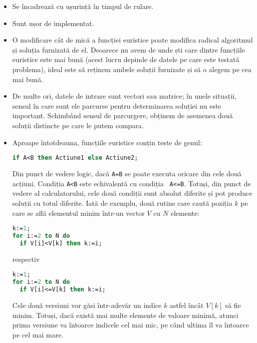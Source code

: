 \begin{itemize}

\item Se încadrează cu ușurință în timpul de rulare.

\item Sunt ușor de implementat.

\item O modificare cât de mică a funcției euristice poate modifica radical
  algoritmul și soluția furnizată de el. Deoarece nu avem de unde ști care
  dintre funcțiile euristice este mai bună (acest lucru depinde de datele pe
  care este testată problema), ideal este să reținem ambele soluții furnizate
  și să o alegem pe cea mai bună.

\item De multe ori, datele de intrare sunt vectori sau matrice; în unele
  situații, sensul în care sunt ele parcurse pentru determinarea soluției nu
  este important. Schimbând sensul de parcurgere, obținem de asemenea două
  soluții distincte pe care le putem compara.

\item Aproape întotdeauna, funcțiile euristice conțin teste de genul:

\begin{lstlisting}[language=Pascal]
if A<B then Actiune1 else Actiune2;
\end{lstlisting}

Din punct de vedere logic, dacă {\tt A=B} se poate executa oricare din cele
două acțiuni. Condiția {\tt A<B} este echivalentă cu condiția {\tt
  A<=B}. Totuși, din punct de vedere al calculatorului, cele două condiții
sunt absolut diferite și pot produce soluții cu totul diferite. Iată de
exemplu, două rutine care caută poziția $k$ pe care se află elementul minim
într-un vector $V$ cu $N$ elemente:

\begin{lstlisting}[language=Pascal]
k:=1;
for i:=2 to N do
  if V[i]<V[k] then k:=i;
\end{lstlisting}

respectiv

\begin{lstlisting}[language=Pascal]
k:=1;
for i:=2 to N do
  if V[i]<=V[k] then k:=i;
\end{lstlisting}

Cele două versiuni vor găsi într-adevăr un indice $k$ astfel încât $V[k]$ să
fie minim. Totuși, dacă există mai multe elemente de valoare minimă, atunci
prima versiune va întoarce indicele cel mai mic, pe când ultima îl va întoarce
pe cel mai mare.

\end{itemize}

